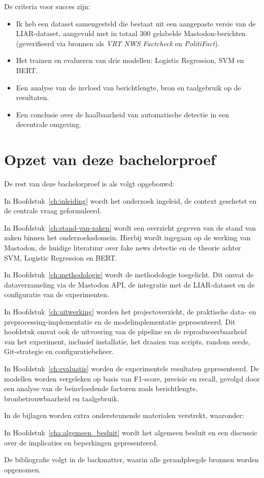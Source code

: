 \documentclass[a4paper,11pt]{report}
\begin{document}
De criteria voor succes zijn:
\begin{itemize}
    \item Ik heb een dataset samengesteld die bestaat uit een aangepaste versie van de LIAR-dataset, aangevuld met in totaal 300 gelabelde Mastodon-berichten (geverifieerd via bronnen als \textit{VRT NWS Factcheck} en \textit{PolitiFact}). 
    \item Het trainen en evalueren van drie modellen: Logistic Regression, SVM en BERT.
    \item Een analyse van de invloed van berichtlengte, bron en taalgebruik op de resultaten.
    \item Een conclusie over de haalbaarheid van automatische detectie in een decentrale omgeving.
\end{itemize}

\section{Opzet van deze bachelorproef}
\label{sec:opzet-bachelorproef}

De rest van deze bachelorproef is als volgt opgebouwd:

In Hoofdstuk~\ref{ch:inleiding} wordt het onderzoek ingeleid, de context geschetst en de centrale vraag geformuleerd.

In Hoofdstuk~\ref{ch:stand-van-zaken} wordt een overzicht gegeven van de stand van zaken binnen het onderzoeksdomein. Hierbij wordt ingegaan op de werking van Mastodon, de huidige literatuur over fake news detectie en de theorie achter SVM, Logistic Regression en BERT.

In Hoofdstuk~\ref{ch:methodologie} wordt de methodologie toegelicht. Dit omvat de dataverzameling via de Mastodon API, de integratie met de LIAR-dataset en de configuratie van de experimenten.

In Hoofdstuk~\ref{ch:uitwerking} worden het projectoverzicht, de praktische data- en preprocessing-implementatie en de modelimplementatie gepresenteerd. Dit hoofdstuk omvat ook de uitvoering van de pipeline en de reproduceerbaarheid van het experiment, inclusief installatie, het draaien van scripts, random seeds, Git-strategie en configuratiebeheer.

In Hoofdstuk~\ref{ch:evaluatie} worden de experimentele resultaten gepresenteerd. De modellen worden vergeleken op basis van F1-score, precisie en recall, gevolgd door een analyse van de beïnvloedende factoren zoals berichtlengte, bronbetrouwbaarheid en taalgebruik.

In de bijlagen worden extra ondersteunende materialen verstrekt, waaronder:


In Hoofdstuk~\ref{cha:algemeen_besluit} wordt het algemeen besluit en een discussie over de implicaties en beperkingen gepresenteerd.

De bibliografie volgt in de backmatter, waarin alle geraadpleegde bronnen worden opgenomen.
\end{document}
